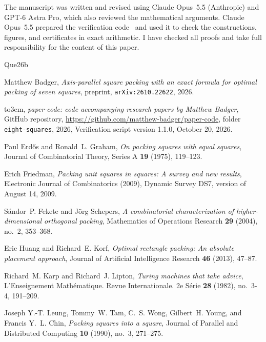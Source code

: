 \documentclass[12pt]{amsart}
\theoremstyle{definition}
\theoremstyle{remark}
\numberwithin{equation}{section}
\numberwithin{figure}{section}
\numberwithin{table}{section}
\begin{document}
The manuscript was written and revised using Claude Opus~5.5
(Anthropic) and GPT-6 Astra Pro, which also reviewed the
mathematical arguments. Claude Opus~5.5 prepared the
verification code~\cite{BadgerCode} and used it to check the constructions, figures, and
certificates in exact arithmetic. I have checked all proofs and
take full responsibility for the content of this paper.
\newcommand{\etalchar}[1]{$^{#1}$}
\providecommand{\bysame}{\leavevmode\hbox to3em{\hrulefill}\thinspace}
\providecommand{\MR}{\relax\ifhmode\unskip\space\fi MR }
\providecommand{\MRhref}[2]{%
  \href{http://www.ams.org/mathscinet-getitem?mr=#1}{#2}
}
\providecommand{\href}[2]{#2}
\begin{thebibliography}{{Que}26b}

Matthew Badger, \emph{Axis-parallel square packing with an exact formula for
  optimal packing of seven squares}, preprint, \texttt{arXiv:2610.22622}, 2026.

\bysame, \emph{paper-code: code accompanying research papers by {M}atthew
  {B}adger}, GitHub repository,
  \url{https://github.com/matthew-badger/paper-code}, folder
  \texttt{eight-squares}, 2026, Verification script version 1.1.0, October 20,
  2026.

Paul Erd{\H o}s and Ronald~L. Graham, \emph{On packing squares with equal
  squares}, Journal of Combinatorial Theory, Series A \textbf{19} (1975),
  119--123.

Erich Friedman, \emph{Packing unit squares in squares: A survey and new
  results}, Electronic Journal of Combinatorics (2009), Dynamic Survey DS7,
  version of August 14, 2009.

S\'andor~P. Fekete and J\"org Schepers, \emph{A combinatorial characterization
  of higher-dimensional orthogonal packing}, Mathematics of Operations Research
  \textbf{29} (2004), no.~2, 353--368.

Eric Huang and Richard~E. Korf, \emph{Optimal rectangle packing: An absolute
  placement approach}, Journal of Artificial Intelligence Research \textbf{46}
  (2013), 47--87.

Richard~M. Karp and Richard~J. Lipton, \emph{Turing machines that take advice},
  L'Enseignement Math\'ematique. Revue Internationale. 2e S\'erie \textbf{28}
  (1982), no.~3-4, 191--209.

\bibitem[LTW{\etalchar{+}}90]{Leung90}
Joseph Y.-T. Leung, Tommy~W. Tam, C.~S. Wong, Gilbert~H. Young, and Francis
  Y.~L. Chin, \emph{Packing squares into a square}, Journal of Parallel and
  Distributed Computing \textbf{10} (1990), no.~3, 271--275.


\end{thebibliography}
\end{document}
